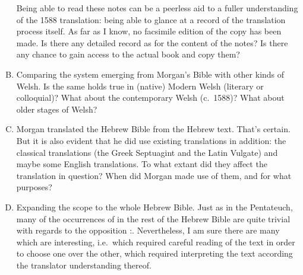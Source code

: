 \begin{enumerate}[A.]
		Being able to read these notes can be a peerless aid to a fuller understanding of the 1588 translation: being able to glance at a record of the translation process itself. As far as I know, no facsimile edition of the copy has been made. Is there any detailed record as for the content of the notes? Is there any chance to gain access to the actual book and copy them?

	\item Comparing the system emerging from Morgan’s Bible with other kinds of Welsh. Is the same holds true in (native) Modern Welsh (literary or colloquial)? What about the contemporary Welsh (c.~1588)? What about older stages of Welsh?

	\item Morgan translated the Hebrew Bible from the Hebrew text. That’s certain. But it is also evident that he did use existing translations in addition: the classical translations (the Greek Septuagint and the Latin Vulgate) and maybe some English translations. To what extant did they affect the translation in question? When did Morgan made use of them, and for what purposes?

	\item Expanding the scope to the whole Hebrew Bible. Just as in the Pentateuch, many of the occurrences of  in the rest of the Hebrew Bible are quite trivial with regards to the opposition \mbox{:}. Nevertheless, I am sure there are many which are interesting, i.e.\ which required careful reading of the text in order to choose one over the other, which required interpreting the text according the translator understanding thereof.


\end{enumerate}
